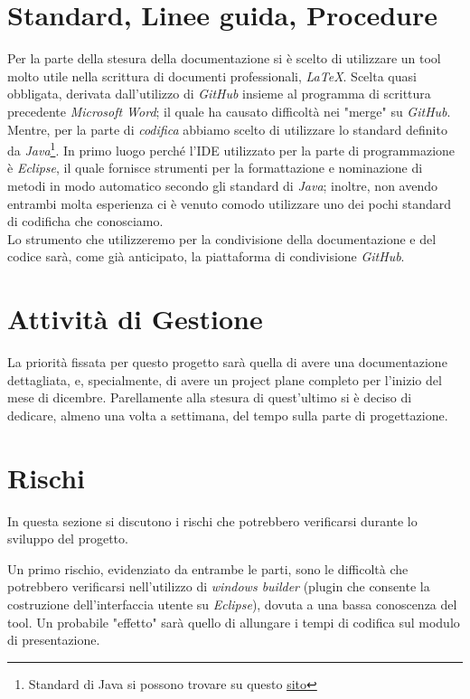 \documentclass[12pt, letterpaper]{book}
\begin{document}
\section{Standard, Linee guida, Procedure}

Per la parte della stesura della documentazione si è scelto di utilizzare un tool molto utile nella scrittura di documenti professionali, \textit{LaTeX}. Scelta quasi obbligata, derivata dall'utilizzo di \textit{GitHub} insieme al programma di scrittura precedente \textit{Microsoft Word}; il quale ha causato difficoltà nei "merge" su \textit{GitHub}.\\

Mentre, per la parte di \textit{codifica} abbiamo scelto di utilizzare lo standard definito da \textit{Java}\footnote{Standard di Java si possono trovare su questo \href{https://www.oracle.com/java/technologies/javase/codeconventions-contents.html}{\underline{sito}}}. In primo luogo perché l'IDE utilizzato per la parte di programmazione è \textit{Eclipse}, il quale fornisce strumenti per la formattazione e nominazione di metodi in modo automatico secondo gli standard di \textit{Java}; inoltre, non avendo entrambi molta esperienza ci è venuto comodo utilizzare uno dei pochi standard di codificha che conosciamo.\\

Lo strumento che utilizzeremo per la condivisione della documentazione e del codice sarà, come già anticipato, la piattaforma di condivisione \textit{GitHub}.

\section{Attività di Gestione}

La priorità fissata per questo progetto sarà quella di avere una documentazione dettagliata, e, specialmente, di avere un project plane completo per l'inizio del mese di dicembre. Parellamente alla stesura di quest'ultimo si è deciso di dedicare, almeno una volta a settimana, del tempo sulla parte di progettazione. 


\section{Rischi}

In questa sezione si discutono i rischi che potrebbero verificarsi durante lo sviluppo del progetto. 

Un primo rischio, evidenziato da entrambe le parti, sono le difficoltà che potrebbero verificarsi nell'utilizzo di \textit{windows builder} (plugin che consente la costruzione dell'interfaccia utente su \textit{Eclipse}), dovuta a una bassa conoscenza del tool. Un probabile "effetto" sarà quello di allungare i tempi di codifica sul modulo di presentazione.
\end{document}

